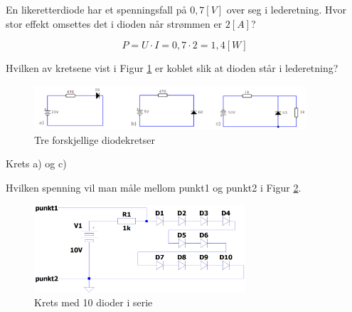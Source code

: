 \begin{question}[name=Oppgave, topic=dioder]
En likeretterdiode har et spenningsfall på $0,7 [V]$ over seg i lederetning. Hvor stor effekt omsettes det i dioden når strømmen er $2 [A]$?
\end{question}

\vspace{0.5cm} %


\begin{solution}[name=Løsningsforslag oppgave]
\[P=U\cdot I = 0,7\cdot2=1,4 [W]\]
	
\end{solution}

\vspace{0.5cm} %

\begin{question}[name=Oppgave, topic=dioder]
	Hvilken av kretsene vist i Figur \ref{fig:3kretser} er koblet slik at dioden står i lederetning?
	
	\begin{figure}[H]
		\centering
		\includegraphics[width=0.9\textwidth]{diode/figurer/3Kretser.png}
		\caption{Tre forskjellige diodekretser}
		\label{fig:3kretser}
	\end{figure}
	
\end{question}

\vspace{0.5cm} %

\begin{solution}[name=Løsningsforslag oppgave]
	Krets a) og c)
\end{solution}
\vspace{0.5cm} %

\begin{question}[name=Oppgave, topic=dioder]
Hvilken spenning vil man måle mellom punkt1 og punkt2 i Figur \ref{fig:10Dserie}.

	\begin{figure}[H]
		\centering
		\includegraphics[width=0.7\textwidth]{diode/figurer/10SerieD.png}
		\caption{Krets med 10 dioder i serie}
		\label{fig:10Dserie}
	\end{figure}

\end{question}

